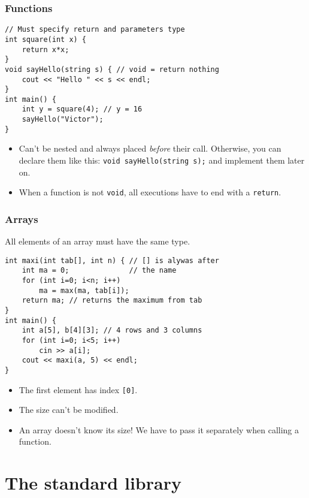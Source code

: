 \documentclass[12pt]{beamer}
\begin{document}
\begin{frame}[fragile]
\frametitle{Functions}
\begin{lstlisting}
// Must specify return and parameters type
int square(int x) {
    return x*x;
}
void sayHello(string s) { // void = return nothing
    cout << "Hello " << s << endl;
}
int main() {
    int y = square(4); // y = 16
    sayHello("Victor");
}
\end{lstlisting}
\begin{itemize}
\item Can't be nested and always placed \emph{before} their call. Otherwise, you can declare them like this: \lstinline|void sayHello(string s);| and implement them later on.
\item When a function is not \lstinline|void|, all executions have to end with a \lstinline|return|.
\end{itemize}
\end{frame}

\begin{frame}[fragile]
\frametitle{Arrays}
All elements of an array must have the same type.
\begin{lstlisting}
int maxi(int tab[], int n) { // [] is alywas after
    int ma = 0;              // the name
    for (int i=0; i<n; i++)
        ma = max(ma, tab[i]);
    return ma; // returns the maximum from tab
}
int main() {
    int a[5], b[4][3]; // 4 rows and 3 columns
    for (int i=0; i<5; i++)
        cin >> a[i];
    cout << maxi(a, 5) << endl;
}
\end{lstlisting}
\begin{itemize}
\item The first element has index \lstinline|[0]|.
\item The size can't be modified.
\item An array doesn't know its size! We have to pass it separately when calling a function.
\end{itemize}
\end{frame}


\section{The standard library}
\end{document}
